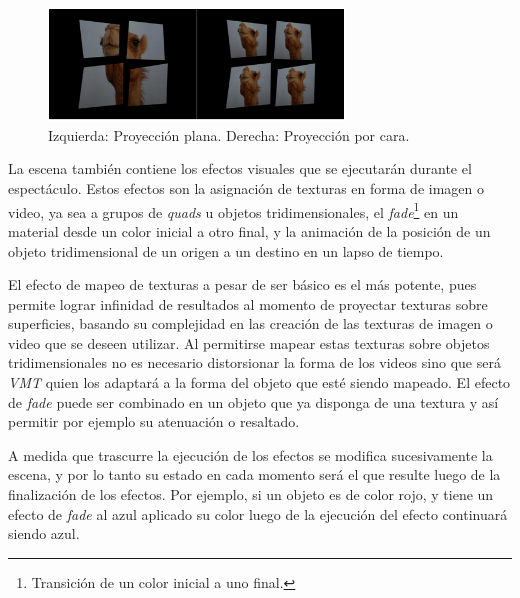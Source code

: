 \begin{figure}[H]
  \centering
    \includegraphics[width=0.7\textwidth]{./Cap5_vmt/vmtengine-maping.png}
  \caption{Izquierda: Proyección plana. Derecha: Proyección por cara.}%
  \label{fig:VMT-Projection}
\end{figure}

La escena también contiene los efectos visuales que se ejecutarán durante el espectáculo. Estos efectos son la asignación de texturas en forma de imagen o video, ya sea a grupos de \emph{quads} u objetos tridimensionales, el \emph{fade}\footnote{Transición de un color inicial a uno final.} en un material desde un color inicial a otro final, y la animación de la posición de un objeto tridimensional de un origen a un destino en un lapso de tiempo.

El efecto de mapeo de texturas a pesar de ser básico es el más potente, pues permite lograr infinidad de resultados al momento de proyectar texturas sobre superficies, basando su complejidad en las creación de las texturas de imagen o video que se deseen utilizar. Al permitirse mapear estas texturas sobre objetos tridimensionales no es necesario distorsionar la forma de los videos sino que será \emph{VMT} quien los adaptará a la forma del objeto que esté siendo mapeado. El efecto de \emph{fade} puede ser combinado en un objeto que ya disponga de una textura y así permitir por ejemplo su atenuación o resaltado.

A medida que trascurre la ejecución de los efectos se modifica sucesivamente la escena, y por lo tanto su estado en cada momento será el que resulte luego de la finalización de los efectos. Por ejemplo, si un objeto es de color rojo, y tiene un efecto de \emph{fade} al azul aplicado su color luego de la ejecución del efecto continuará siendo azul.


